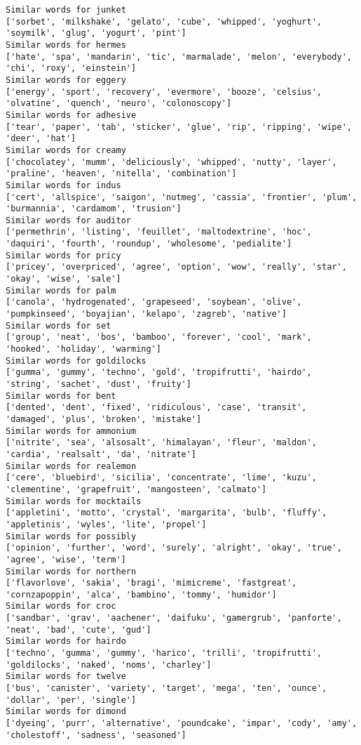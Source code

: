 \documentclass[11pt]{article}
\begin{document}
\begin{Verbatim}[commandchars=\\\{\}]
Similar words for junket
['sorbet', 'milkshake', 'gelato', 'cube', 'whipped', 'yoghurt', 'soymilk', 'glug', 'yogurt', 'pint']
Similar words for hermes
['hate', 'spa', 'mandarin', 'tic', 'marmalade', 'melon', 'everybody', 'chi', 'roxy', 'einstein']
Similar words for eggery
['energy', 'sport', 'recovery', 'evermore', 'booze', 'celsius', 'olvatine', 'quench', 'neuro', 'colonoscopy']
Similar words for adhesive
['tear', 'paper', 'tab', 'sticker', 'glue', 'rip', 'ripping', 'wipe', 'deer', 'hat']
Similar words for creamy
['chocolatey', 'mumm', 'deliciously', 'whipped', 'nutty', 'layer', 'praline', 'heaven', 'nitella', 'combination']
Similar words for indus
['cert', 'allspice', 'saigon', 'nutmeg', 'cassia', 'frontier', 'plum', 'burmannia', 'cardamom', 'trusion']
Similar words for auditor
['permethrin', 'listing', 'feuillet', 'maltodextrine', 'hoc', 'daquiri', 'fourth', 'roundup', 'wholesome', 'pedialite']
Similar words for pricy
['pricey', 'overpriced', 'agree', 'option', 'wow', 'really', 'star', 'okay', 'wise', 'sale']
Similar words for palm
['canola', 'hydrogenated', 'grapeseed', 'soybean', 'olive', 'pumpkinseed', 'boyajian', 'kelapo', 'zagreb', 'native']
Similar words for set
['group', 'neat', 'bos', 'bamboo', 'forever', 'cool', 'mark', 'hooked', 'holiday', 'warming']
Similar words for goldilocks
['gumma', 'gummy', 'techno', 'gold', 'tropifrutti', 'hairdo', 'string', 'sachet', 'dust', 'fruity']
Similar words for bent
['dented', 'dent', 'fixed', 'ridiculous', 'case', 'transit', 'damaged', 'plus', 'broken', 'mistake']
Similar words for ammonium
['nitrite', 'sea', 'alsosalt', 'himalayan', 'fleur', 'maldon', 'cardia', 'realsalt', 'da', 'nitrate']
Similar words for realemon
['cere', 'bluebird', 'sicilia', 'concentrate', 'lime', 'kuzu', 'clementine', 'grapefruit', 'mangosteen', 'calmato']
Similar words for mocktails
['appletini', 'motto', 'crystal', 'margarita', 'bulb', 'fluffy', 'appletinis', 'wyles', 'lite', 'propel']
Similar words for possibly
['opinion', 'further', 'word', 'surely', 'alright', 'okay', 'true', 'agree', 'wise', 'term']
Similar words for northern
['flavorlove', 'sakia', 'bragi', 'mimicreme', 'fastgreat', 'cornzapoppin', 'alca', 'bambino', 'tommy', 'humidor']
Similar words for croc
['sandbar', 'grav', 'aachener', 'daifuku', 'gamergrub', 'panforte', 'neat', 'bad', 'cute', 'gud']
Similar words for hairdo
['techno', 'gumma', 'gummy', 'harico', 'trilli', 'tropifrutti', 'goldilocks', 'naked', 'noms', 'charley']
Similar words for twelve
['bus', 'canister', 'variety', 'target', 'mega', 'ten', 'ounce', 'dollar', 'per', 'single']
Similar words for dimond
['dyeing', 'purr', 'alternative', 'poundcake', 'impar', 'cody', 'amy', 'cholestoff', 'sadness', 'seasoned']

\end{Verbatim}
\end{document}
